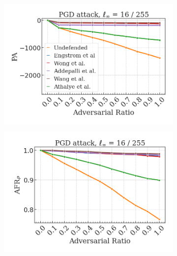 \begin{figure}[H]
    \begin{subfigure}[b]{0.45\textwidth}
        \centering
        \includegraphics[width=\textwidth]{img/results_discussion/adversarial/PGD_0.0627_logPA_linear.png}
    \end{subfigure}
    \begin{subfigure}[b]{0.45\textwidth}
        \centering
        \includegraphics[width=\textwidth]{img/results_discussion/adversarial/PGD_0.0627_AFR_pred.png}
    \end{subfigure}

    \vspace{1em}


\end{figure}
